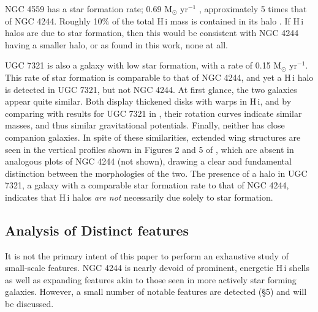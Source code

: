 \documentclass{emulateapj}
\begin{document}
\par
     NGC 4559 has a star formation rate; 0.69 M$_{\odot}$ yr$^{-1}$ \citep{2011A&A...526A.118H}, approximately 5 times that of NGC 4244.  Roughly 10$\%$ of the total {\sc H\,i} mass is contained in its halo \citep{2005A&A...439..947B}.  If {\sc H\,i} halos are due to star formation, then this would be consistent with NGC 4244 having a smaller halo, or as found in this work, none at all.     
     
\par
     UGC 7321 is also a galaxy with low star formation, with a rate of 0.15 M$_{\odot}$ yr$^{-1}$.  This rate of star formation is comparable to that of NGC 4244, and yet a {\sc H\,i} halo is detected in UGC 7321, but not NGC 4244.  At first glance, the two galaxies appear quite similar.  Both display thickened disks with warps in {\sc H\,i}, and by comparing with results for UGC 7321 in \citet{2010A&A...515A..63O}, their rotation curves indicate similar masses, and thus similar gravitational potentials.  Finally, neither has close companion galaxies.  In spite of these similarities, extended wing structures are seen in the vertical profiles shown in Figures 2 and 5 of \citet{2003ApJ...593..721M}, which are absent in analogous plots of NGC 4244 (not shown), drawing a clear and fundamental distinction between the morphologies of the two.  The presence of a halo in UGC 7321, a galaxy with a comparable star formation rate to that of NGC 4244, indicates that {\sc H\,i} halos \textit{are not} necessarily due solely to star formation.     
      


\subsection{Analysis of Distinct features} \label{Section6.4} 

\par
    It is not the primary intent of this paper to perform an exhaustive study of small-scale features.  NGC 4244 is nearly devoid of prominent, energetic {\sc H\,i} shells as well as expanding features akin to those seen in more actively star forming galaxies.  However, a small number of notable features are detected (\S 5) and will be discussed.
\end{document}
